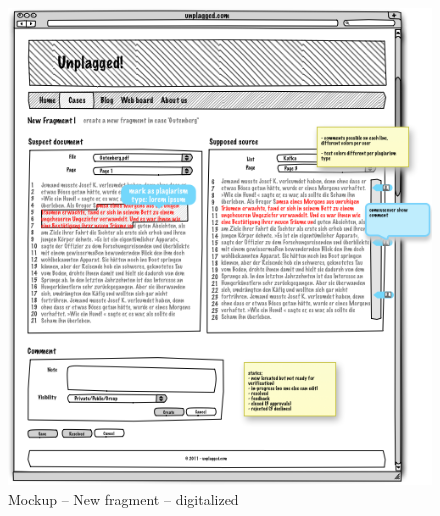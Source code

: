 \begin{appendix}
\begin{figure}[!h]
  \centering
    \includegraphics[width=\textwidth]{mockups/3_new_fragment.png}
  \caption{Mockup – New fragment – digitalized }
  \label{fig:3newFragmentMockup}
\end{figure}


\end{appendix}

